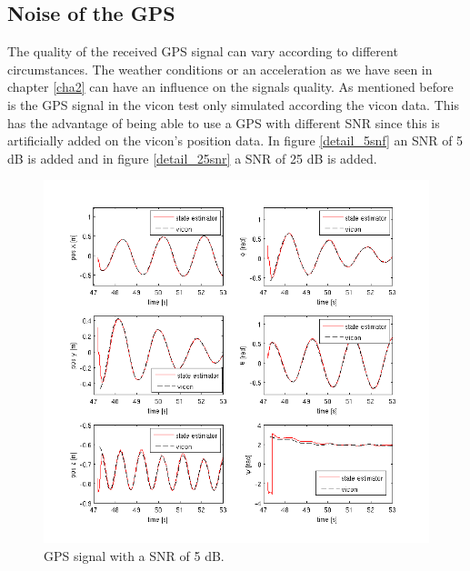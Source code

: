 \subsection{Noise of the GPS}\label{noise}
The quality of the received GPS signal can vary according to different circumstances. The weather conditions or  an acceleration as we have seen in chapter \ref{cha2} can have an influence on the signals quality. As mentioned before is the GPS signal in the vicon test only simulated according the vicon data. This has the advantage of being able to use a GPS with different SNR since this is artificially added on the vicon's position data.
In figure \ref{detail_5snf} an SNR of 5 dB is added and in figure \ref{detail_25snr} a SNR of 25 dB is added.
\begin{figure}[h]
\centering
\includegraphics[width=1\textwidth]{pictures/2_2_SNR5_detail_GPS.png}
\caption{GPS signal with a SNR of 5 dB.}
\label{detail_5snr}
\end{figure}
